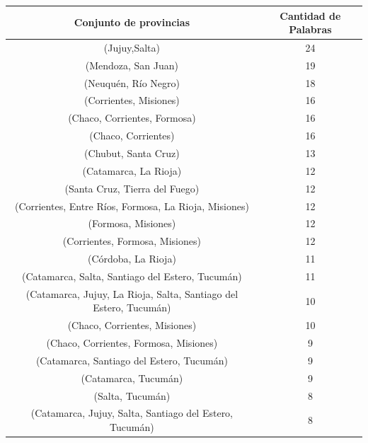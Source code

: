 \begin{table}[]
\centering
\label{tab:regiones}
\begin{tabular}{|c|c|}
\hline
Conjunto de provincias                                 & Cantidad de Palabras  \\ \hline
(Jujuy,Salta)                                          & 24          \\
(Mendoza, San Juan)                                    & 19          \\
(Neuquén, Río Negro)                                   & 18          \\
(Corrientes, Misiones)                                 & 16          \\
(Chaco, Corrientes, Formosa)                           & 16          \\
(Chaco, Corrientes)                                    & 16          \\
(Chubut, Santa Cruz)                                   & 13          \\
(Catamarca, La Rioja)                                  & 12          \\
(Santa Cruz, Tierra del Fuego)                         & 12          \\
(Corrientes, Entre Ríos, Formosa, La Rioja, Misiones)  & 12          \\  %
(Formosa, Misiones)                                    & 12          \\
(Corrientes, Formosa, Misiones)                        & 12          \\
(Córdoba, La Rioja)                                    & 11          \\
(Catamarca, Salta, Santiago del Estero, Tucumán)       & 11          \\
(Catamarca, Jujuy, La Rioja, Salta, Santiago del Estero, Tucumán) & 10          \\
(Chaco, Corrientes, Misiones)                          & 10          \\
(Chaco, Corrientes, Formosa, Misiones)                 & 9           \\
(Catamarca, Santiago del Estero, Tucumán)              & 9           \\
(Catamarca, Tucumán)                                   & 9           \\
(Salta, Tucumán)                                       & 8           \\
(Catamarca, Jujuy, Salta, Santiago del Estero, Tucumán)& 8           \\

\end{tabular}
\end{table}
